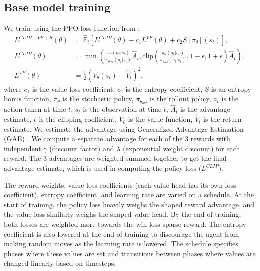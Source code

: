 \documentclass{article}
\begin{document}
\subsection{Base model training}
We train using the PPO loss function from \citet{DBLP:journals/corr/SchulmanWDRK17}:
\begin{align}
    L^{CLIP+VF+S}(\theta) &= \hat{\mathbb{E}}_t \left[ L^{CLIP}(\theta) - c_1 L^{VF}(\theta) + c_2 S\left[\pi_\theta\right](s_t) \right], \\
    L^{CLIP}(\theta) &= \min \left( \frac{\pi_\theta(a_t|s_t)}{\pi_{\theta_{old}}(a_t|s_t)} \hat{A}_t, \text{clip}\left( \frac{\pi_\theta(a_t|s_t)}{\pi_{\theta_{old}}(a_t|s_t)}, 1-\epsilon, 1+\epsilon \right) \hat{A}_t \right), \\
    L^{VF}(\theta) &= \frac{1}{2} \left( V_\theta(s_t) - \hat{V}_t \right)^2,
\end{align}
where $c_1$ is the value loss coefficient, $c_2$ is the entropy coefficient, $S$ is an
entropy bonus function, $\pi_\theta$ is the stochastic policy, $\pi_{\theta_{old}}$ is the rollout policy, $a_t$
is the action taken at time $t$, $s_t$ is the observation at time $t$, $\hat{A}_t$
is the advantage estimate,  $\epsilon$ is the clipping coefficient, $V_\theta$ is the
value function, $\hat{V}_t$ is the return estimate. We estimate the advantage
using Generalized Advantage Estimation (GAE) \citep{DBLP:journals/corr/SchulmanMLJA15}.
We compute a separate advantage for each of the 3 rewards with independent $\gamma$
(discount factor) and $\lambda$ (exponential weight discount) for each reward. The 3 
advantages are weighted summed together to get the final advantage estimate, which is
used in computing the policy loss ($L^{CLIP}$).

The reward weights, value loss coefficients (each value
head has its own loss coefficient), entropy coefficient, and learning rate are varied on
a schedule. At the start of training, the policy loss heavily weighs the shaped 
reward advantage, and the value loss similarly weighs the shaped value head. By the end
of training, both losses are weighted more towards the win-loss sparse reward. The entropy coefficient is also
lowered at the end of training to discourage the agent from making random moves as the
learning rate is lowered. The schedule specifies phases where these values are set and
transitions between phases where values are changed linearly based on timesteps.
\end{document}
